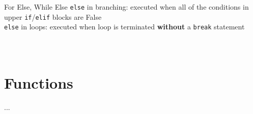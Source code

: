        \begin{frame}{For Else, While Else}
            \texttt{else} in branching: executed when all of the conditions in upper \texttt{if}/\texttt{elif} blocks are False\\
            \texttt{else} in loops: executed when loop is terminated \textbf{without} a \texttt{break} statement
            \vspace{-3mm}
            \begin{columns}
                \begin{column}{0.52\textwidth}
                    \inputminted[frame=single,framesep=2pt]{python3}{../Review1/code-examples/while_else.py}
                \end{column}
                \begin{column}{0.48\textwidth}
                    \inputminted[frame=single,framesep=2pt]{python3}{../Review1/code-examples/for_else.py}
                \end{column}
            \end{columns}
        \end{frame}

    \section{Functions}
        \begin{frame}{...}
            
        \end{frame}

